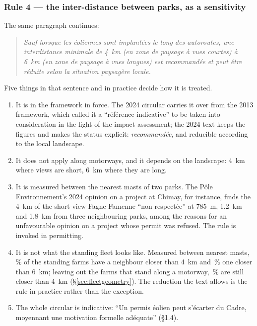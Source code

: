 \documentclass[11pt,a4paper]{article}
\begin{document}
\subsubsection{Rule 4 --- the inter-distance between parks, as a sensitivity}

The same paragraph continues:

\begin{quote}\small\itshape
Sauf lorsque les éoliennes sont implantées le long des autoroutes, une
interdistance minimale de 4~km (en zone de paysage à vues courtes) à 6~km (en
zone de paysage à vues longues) est recommandée et peut être réduite selon la
situation paysagère locale.
\end{quote}

Five things in that sentence and in practice decide how it is treated.

\begin{enumerate}
  \item It is in the framework in force. The 2024 circular carries it over from
    the 2013 framework, which called it a ``référence indicative'' to be taken
    into consideration in the light of the impact assessment; the 2024 text
    keeps the figures and makes the status explicit: \emph{recommandée}, and
    reducible according to the local landscape.
  \item It does not apply along motorways, and it depends on the landscape:
    4~km where views are short, 6~km where they are long.
  \item It is measured between the nearest masts of two parks. The Pôle
    Environnement's 2024 opinion on a project at Chimay, for instance, finds the
    4~km of the short-view Fagne-Famenne ``non respectée'' at 785~m, 1.2~km and
    1.8~km from three neighbouring parks, among the reasons for an
    unfavourable opinion on a project whose permit was refused. The rule is
    invoked in permitting.
  \item It is not what the standing fleet looks like. Measured between nearest
    masts, \FleetEdgeBelowFour{}\,\% of the \FleetFarms{} standing farms have a
    neighbour closer than 4~km and \FleetEdgeBelowSix{}\,\% one closer than
    6~km; leaving out the \FleetMwFarms{} farms that stand along a motorway,
    \FleetNonMwEdgeBelowFour{}\,\% are still closer than 4~km
    (§\ref{sec:fleetgeometry}). The reduction the text allows is the rule in
    practice rather than the exception.
  \item The whole circular is indicative: ``Un permis éolien peut s'écarter du
    Cadre, moyennant une motivation formelle adéquate'' (§1.4).
\end{enumerate}
\end{document}
